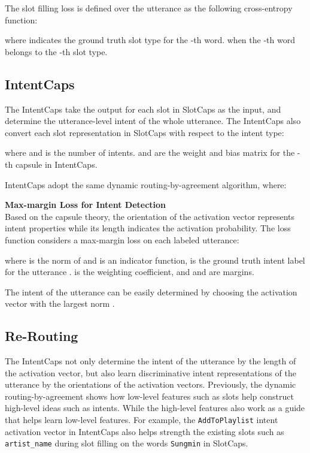 \documentclass[11pt,a4paper,hyphens]{article}
\newcommand{\SecondCapsule}{SlotCaps}
\newcommand{\ThirdCapsule}{IntentCaps}
\begin{document}
The slot filling loss is defined over the utterance as the following cross-entropy function:

where  indicates the ground truth slot type for the -th word.  when the -th word belongs to the -th slot type.

\subsection{\ThirdCapsule}
The {\ThirdCapsule} take the output  for each slot  in {\SecondCapsule} as the input, and determine the utterance-level intent of the whole utterance.
The {\ThirdCapsule} also convert each slot representation in {\SecondCapsule} with respect to the intent type:

where  and  is the number of intents.  and  are the weight and bias matrix for the -th capsule in {\ThirdCapsule}.

{\ThirdCapsule} adopt the same dynamic routing-by-agreement algorithm, where:


\noindent\textbf{Max-margin Loss for Intent Detection}\\
Based on the capsule theory, the orientation of the activation vector  represents intent properties while its length indicates the activation probability. 
The loss function considers a max-margin loss on each labeled utterance:

where  is the norm of  and  is an indicator function,  is the ground truth intent label for the utterance .  is the weighting coefficient, and  and  are margins.

The intent of the utterance can be easily determined by choosing the activation vector with the largest norm .

\subsection{Re-Routing}
The {\ThirdCapsule} not only determine the intent of the utterance by the length of the activation vector, but also learn discriminative intent representations of the utterance by the orientations of the activation vectors.
Previously, the dynamic routing-by-agreement shows how low-level features such as slots help construct high-level ideas such as intents. While the high-level features also work as a guide that helps learn low-level features. For example, the \texttt{AddToPlaylist} intent activation vector in {\ThirdCapsule} also helps strength the existing slots such as \texttt{artist\_name} during slot filling on the words \texttt{Sungmin} in {\SecondCapsule}.
\end{document}
